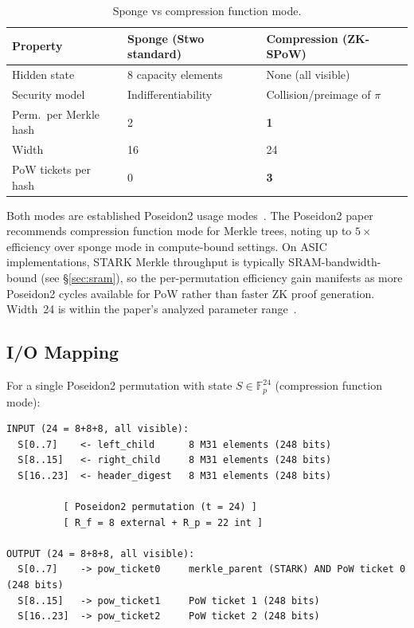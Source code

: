 \documentclass[11pt,a4paper]{article}
\begin{document}
\begin{table}[h]
\centering
\begin{tabular}{@{}lll@{}}
\toprule
Property & Sponge (Stwo standard) & Compression (ZK-SPoW) \\
\midrule
Hidden state & 8 capacity elements & None (all visible) \\
Security model & Indifferentiability & Collision/preimage of $\pi$ \\
Perm.\ per Merkle hash & 2 & \textbf{1} \\
Width & 16 & 24 \\
PoW tickets per hash & 0 & \textbf{3} \\
\bottomrule
\end{tabular}
\caption{Sponge vs compression function mode.}
\label{tab:sponge-vs-comp}
\end{table}

Both modes are established Poseidon2 usage modes~\cite{poseidon2}. The Poseidon2 paper recommends compression function mode for Merkle trees, noting up to $5\times$ efficiency over sponge mode in compute-bound settings. On ASIC implementations, STARK Merkle throughput is typically SRAM-bandwidth-bound (see \S\ref{sec:sram}), so the per-permutation efficiency gain manifests as more Poseidon2 cycles available for PoW rather than faster ZK proof generation. Width~24 is within the paper's analyzed parameter range~\cite{poseidon2,plonky3}.

\subsection{I/O Mapping}
\label{sec:io}

For a single Poseidon2 permutation with state $S \in \mathbb{F}_p^{24}$ (compression function mode):

\begin{Verbatim}[fontsize=\small]
INPUT (24 = 8+8+8, all visible):
  S[0..7]    <- left_child      8 M31 elements (248 bits)
  S[8..15]   <- right_child     8 M31 elements (248 bits)
  S[16..23]  <- header_digest   8 M31 elements (248 bits)

          [ Poseidon2 permutation (t = 24) ]
          [ R_f = 8 external + R_p = 22 int ]

OUTPUT (24 = 8+8+8, all visible):
  S[0..7]    -> pow_ticket0     merkle_parent (STARK) AND PoW ticket 0 (248 bits)
  S[8..15]   -> pow_ticket1     PoW ticket 1 (248 bits)
  S[16..23]  -> pow_ticket2     PoW ticket 2 (248 bits)
\end{Verbatim}
\end{document}
